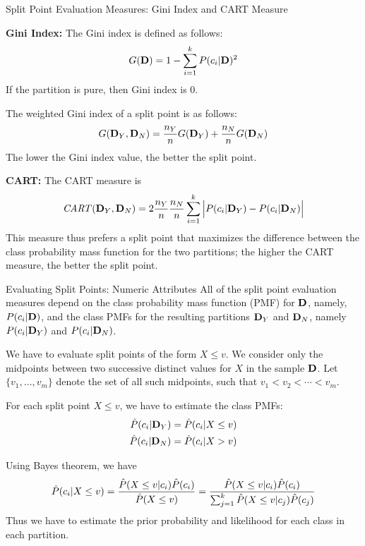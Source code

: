 \begin{frame}{Split Point Evaluation Measures: Gini Index and CART
  Measure}

{\bf Gini Index:}
The Gini index is def\/{i}ned as follows:
\begin{align*}
  G(\mathbf{D}) = 1 - \sum_{i=1}^{k}{P(c_i|\mathbf{D})^2}
\end{align*}
If the partition is pure, then Gini index is $0$. 

\medskip
The weighted Gini index of a split point is as follows:
\begin{align*}
  G(\mathbf{D}_Y,\mathbf{D}_N) = \frac{n_Y}{n}G(\mathbf{D}_Y)+\frac{n_N}{n}G(\mathbf{D}_N)
\end{align*}
The lower the Gini index
value, the better the split point.

\bigskip
{\bf CART: }
The CART measure is
\begin{align*}
  \mathit{CART}(\mathbf{D}_Y,\mathbf{D}_N) =
  2 \frac{n_Y}{n} \frac{n_N}{n}
  \sum_{i=1}^{k}{\Bigl|P(c_i|\mathbf{D}_Y)-P(c_i|\mathbf{D}_N)\Bigr|}
\end{align*}
This measure thus prefers a split point that maximizes the
difference between the class probability mass function for the two partitions; the higher the CART measure, the better the
split point.
\end{frame}



\begin{frame}{Evaluating Split Points: Numeric Attributes}
All of the
split point evaluation measures depend on the class probability mass function (PMF) for $\mathbf{D}$,
namely, $P(c_i | \mathbf{D})$, and the class PMFs for the resulting
partitions $\mathbf{D}_Y$ and $\mathbf{D}_N$, namely $P(c_i | \mathbf{D}_Y)$ and
$P(c_i| \mathbf{D}_N)$. 

\medskip
We have to evaluate split points of
the form $X \le v$. We consider only the
midpoints between two successive distinct values for $X$ in the
sample $\mathbf{D}$. 
Let $\{v_1, \ldots, v_m\}$ denote the set of all such midpoints,
such that $v_1 < v_2 < \cdots < v_m$. 

\medskip
For each split point $X \le
v$, we have to estimate the class PMFs:
\begin{align*}
  \hat{P}(c_i|\mathbf{D}_Y) & = \hat{P}(c_i | X \le v) \\
\hat{P}(c_i|\mathbf{D}_N) &= \hat{P}(c_i | X > v) 
\end{align*}

\medskip
Using 
Bayes theorem, we have
\begin{align*}
  \hat{P}(c_i | X \le v) = \frac{\hat{P}(X \le v|c_i) \hat{P}(c_i)}{\hat{P}(X \le v)}
  = \frac{\hat{P}(X \le v|c_i) \hat{P}(c_i)}{\sum_{j=1}^k\hat{P}(X \le v|c_{j}) \hat{P}(c_{j})}
\end{align*}
Thus we have to estimate the prior probability and likelihood for each
class in each partition.
\end{frame}


